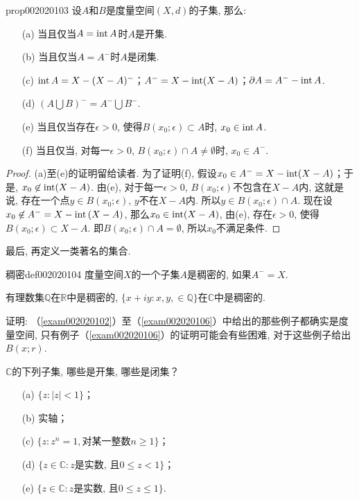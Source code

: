 \begin{proposition}{}{prop002020103}
设$A$和$B$是度量空间$(X, d)$的子集, 那么: 
\begin{enumerate}
\item[(a)]当且仅当$A = \operatorname{int}{A}$时$A$是开集. 
\item[(b)]当且仅当$A = A^-$时$A$是闭集. 
\item[(c)]$\operatorname{int}{A} = X - (X-A)^-$；$A^- = X- \operatorname{int}(X-A)$；$\partial{A} = A^- - \operatorname{int}{A}$. 
\item[(d)]$(A \bigcup B)^- = A^- \bigcup B^-$. 
\item[(e)]当且仅当存在$\epsilon > 0$, 使得$B(x_0; \epsilon) \subset A$时, $x_0 \in \operatorname{int}{A}$. 
\item[(f)]当且仅当, 对每一$\epsilon > 0$, $B(x_0; \epsilon) \cap A \neq \emptyset$时, $x_0 \in A^-$. 
\end{enumerate}
\end{proposition}
\begin{proof}
(a)至(e)的证明留给读者. 为了证明(f), 假设$x_0 \in A^- = X - \operatorname{int}(X-A)$；于是, $x_0 \not\in \operatorname{int}(X-A)$. 由(e), 对于每一$\epsilon > 0$, $B(x_0; \epsilon)$不包含在$X-A$内, 这就是说, 存在一个点$y \in B(x_0; \epsilon)$, $y$不在$X-A$内. 所以$y \in B(x_0;\epsilon) \cap A$. 现在设$x_0 \not\in A^- = X - \operatorname{int}{(X-A)}$, 那么$x_0 \in \operatorname{int}(X-A)$, 由(e), 存在$\epsilon > 0$, 使得$B(x_0; \epsilon) \subset X-A$. 即$B(x_0; \epsilon) \cap A = \emptyset$, 所以$x_0$不满足条件. 
\end{proof}

最后, 再定义一类著名的集合. 

\begin{definition}{稠密}{def002020104}
度量空间$X$的一个子集$A$是稠密的, 如果$A^- = X$. 
\end{definition}

有理数集$\mathbb{Q}$在$\mathbb{R}$中是稠密的, $\{x + iy : x, y, \in \mathbb{Q}\}$在$\mathbb{C}$中是稠密的. 

\begin{exercise}
证明: （\ref{exam002020102}）至（\ref{exam002020106}）中给出的那些例子都确实是度量空间, 只有例子（\ref{exam002020106}）的证明可能会有些困难, 对于这些例子给出$B(x;r)$. 
\end{exercise}

\begin{exercise}
$\mathbb{C}$的下列子集, 哪些是开集, 哪些是闭集？
\begin{enumerate}
\item[(a)]$\{z:|z|<1\}$；
\item[(b)]实轴；
\item[(c)]$\{z: z^n=1,\text{对某一整数}n \ge 1\}$；
\item[(d)]$\{z \in \mathbb{C}: z\text{是实数, 且}0 \le z <1\}$；
\item[(e)]$\{z \in \mathbb{C}: z\text{是实数, 且}0 \le z \le 1\}$. 
\end{enumerate}
\end{exercise}

